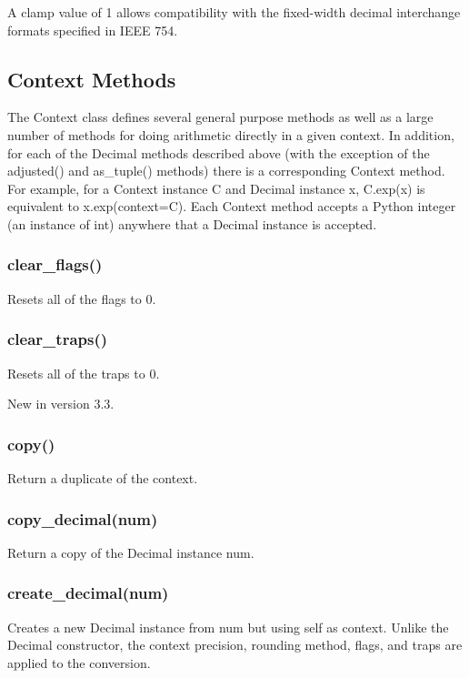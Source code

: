 A clamp value of 1 allows compatibility with the fixed-width decimal interchange formats specified in IEEE 754.

\subsection{Context Methods}
The Context class defines several general purpose methods as well as a large number of methods for doing arithmetic directly in a given context. In addition, for each of the Decimal methods described above (with the exception of the adjusted() and as\_tuple() methods) there is a corresponding Context method. For example, for a Context instance C and Decimal instance x, C.exp(x) is equivalent to x.exp(context=C). Each Context method accepts a Python integer (an instance of int) anywhere that a Decimal instance is accepted.


\subsubsection{clear\_flags()}

Resets all of the flags to 0.

\subsubsection{clear\_traps()}

Resets all of the traps to 0.

New in version 3.3.

\subsubsection{copy()}

Return a duplicate of the context.

\subsubsection{copy\_decimal(num)}

Return a copy of the Decimal instance num.

\subsubsection{create\_decimal(num)}

Creates a new Decimal instance from num but using self as context. Unlike the Decimal constructor, the context precision, rounding method, flags, and traps are applied to the conversion.

